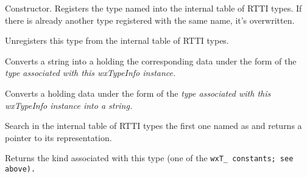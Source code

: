 

\label{wxtypeinfowxtypeinfo}


Constructor. Registers the type named  into the internal table of RTTI types.
If there is already another type registered with the same name, it's overwritten.


\label{wxtypeinfodtor}


Unregisters this type from the internal table of RTTI types.


\label{wxtypeinfoconvertfromstring}


Converts a string into a  holding the corresponding data under the form
of the \it{type} associated with this wxTypeInfo instance.

\label{wxtypeinfoconverttostring}


Converts a  holding data under the form
of the \it{type} associated with this wxTypeInfo instance into a string.


\label{wxtypeinfofindtype}



Search in the internal table of RTTI types the first one named as  and
returns a pointer to its representation.


\label{wxtypeinfogetkind}


Returns the kind associated with this type (one of the \tt{wxT\_} constants; see above).


